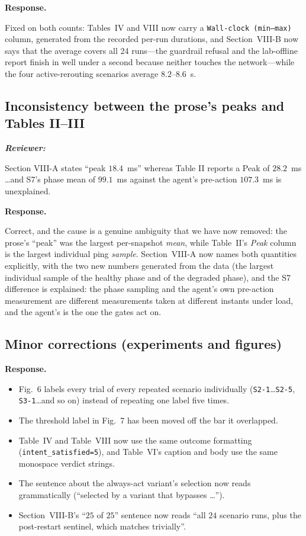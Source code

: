 \documentclass[11pt,a4paper]{article}
\newenvironment{reviewer}{\par\medskip\noindent\begin{minipage}{\linewidth}\small\itshape\color{quote}\textbf{Reviewer:}\par}{\end{minipage}\medskip\par}
\newenvironment{response}{\par\noindent\begin{minipage}{\linewidth}\small\textbf{Response.}\par}{\end{minipage}\medskip\par}
\begin{document}
\begin{response}
Fixed on both counts: Tables~IV and VIII now carry a
\texttt{Wall-clock (min--max)} column, generated from the recorded
per-run durations, and Section~VIII-B now says that the average covers
all 24 runs---the guardrail refusal and the lab-offline report finish in
well under a second because neither touches the network---while the four
active-rerouting scenarios average $8.2$--$8.6$~s.
\end{response}

\subsection{Inconsistency between the prose's peaks and Tables II--III}

\begin{reviewer}
Section VIII-A states ``peak $18.4$~ms'' whereas Table II reports a Peak
of $28.2$~ms \dots and S7's phase mean of $99.1$~ms against the agent's
pre-action $107.3$~ms is unexplained.
\end{reviewer}

\begin{response}
Correct, and the cause is a genuine ambiguity that we have now removed:
the prose's ``peak'' was the largest per-snapshot \emph{mean}, while
Table~II's \emph{Peak} column is the largest individual ping \emph{sample}.
Section~VIII-A now names both quantities explicitly, with the two new
numbers generated from the data (the largest individual sample of the
healthy phase and of the degraded phase), and the S7 difference is
explained: the phase sampling and the agent's own pre-action measurement
are different measurements taken at different instants under load, and
the agent's is the one the gates act on.
\end{response}

\subsection{Minor corrections (experiments and figures)}

\begin{response}
\begin{itemize}
  \item Fig.~6 labels every trial of every repeated scenario individually
    (\texttt{S2-1}\dots\texttt{S2-5}, \texttt{S3-1}\dots and so on)
    instead of repeating one label five times.
  \item The threshold label in Fig.~7 has been moved off the bar it
    overlapped.
  \item Table~IV and Table~VIII now use the same outcome formatting
    (\texttt{intent\_satisfied=5}), and Table~VI's caption and body use
    the same monospace verdict strings.
  \item The sentence about the always-act variant's selection now reads
    grammatically (``selected by a variant that bypasses \dots'').
  \item Section~VIII-B's ``$25$ of $25$'' sentence now reads ``all $24$
    scenario runs, plus the post-restart sentinel, which matches
    trivially''.
\end{itemize}
\end{response}
\end{document}

